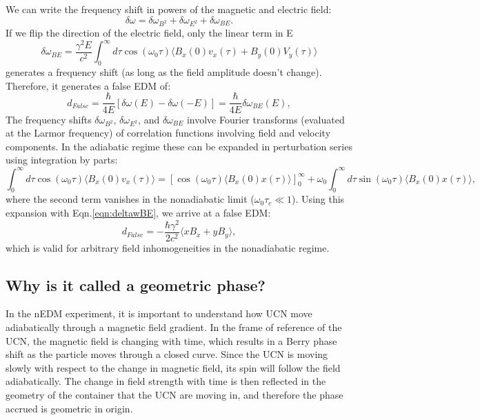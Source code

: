 We can write the frequency shift in powers of the magnetic and electric field:
%
\begin{equation}
\delta \omega = \delta \omega_{B^2} + \delta \omega_{E^2} + \delta \omega_{BE}.
\end{equation}
%
If we flip the direction of the electric field, only the linear term in E 
%
\begin{equation}
\label{eqn:deltawBE}
\delta \omega_{BE} = \frac{\gamma^2 E}{c^2} \int_{0}^{\infty} d\tau \cos(\omega_0 \tau) \langle B_x(0) v_x(\tau) + B_y(0) V_y(\tau)\rangle
\end{equation}
%
generates a frequency shift (as long as the field amplitude doesn't
change).  Therefore, it generates a false EDM of:
%
\begin{equation}
d_{False} = \frac{\hbar}{4E}[\delta \omega(E) - \delta \omega (-E)] = \frac{\hbar}{4E}\delta \omega_{BE}(E) ,
\end{equation}
%
The frequency shifts $\delta \omega_{B^2}$, $\delta \omega_{E^2}$, and
$\delta \omega_{BE}$ involve Fourier transforms (evaluated at the
Larmor frequency) of correlation functions involving field and
velocity components.  In the adiabatic regime these can be expanded in
perturbation series using integration by parts:
%
\begin{equation}
\int_{0}^{\infty} d\tau \cos(\omega_0 \tau)\langle B_x(0) v_x(\tau)\rangle = [\cos(\omega_0 \tau)\langle B_x(0)x(\tau)\rangle]_{0}^{\infty} + \omega_0 \int_{0}^{\infty} d\tau \sin(\omega_0 \tau)\langle B_x(0) x(\tau)\rangle ,
\end{equation}
%
where the second term vanishes in the nonadiabatic limit
($\omega_0 \tau_c \ll 1$).  Using this expansion with
Eqn.\ref{eqn:deltawBE}, we arrive at a false EDM:
%
\begin{equation}
d_{False} = - \frac{\hbar \gamma^2}{2 c^2} \langle x B_x + y B_y \rangle,
\end{equation}
%
which is valid for arbitrary field inhomogeneities in the nonadiabatic
regime.


\subsection{Why is it called a geometric phase?}

In the nEDM experiment, it is important to understand how UCN move
adiabatically through a magnetic field gradient.  In the frame of
reference of the UCN, the magnetic field is changing with time, which
results in a Berry phase shift as the particle moves through a closed
curve.  Since the UCN is moving slowly with respect to the change in
magnetic field, its spin will follow the field adiabatically.  The
change in field strength with time is then reflected in the geometry
of the container that the UCN are moving in, and therefore the phase
accrued is geometric in origin.
 

